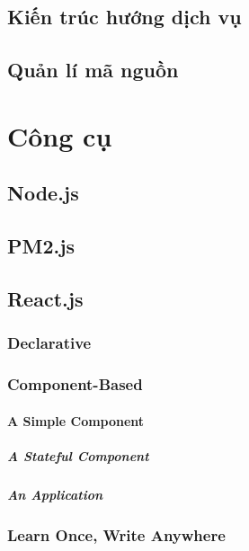 \subsection{Kiến trúc hướng dịch vụ}
\blindtext
\subsection{Quản lí mã nguồn}
\blindtext

\section{Công cụ}


\subsection{Node.js}
\blindtext

\subsection{PM2.js}
\blindtext
\subsection{React.js} 
\blindtext

\subsubsection{Declarative}
\blindtext

\blindtext 

\subsubsection{Component-Based}
\blindtext
\paragraph{A Simple Component}
\blindtext
\subparagraph{A Stateful Component}
\blindtext
\subparagraph{An Application}
\blindtext
\subsubsection{Learn Once, Write Anywhere}
\blindtext
